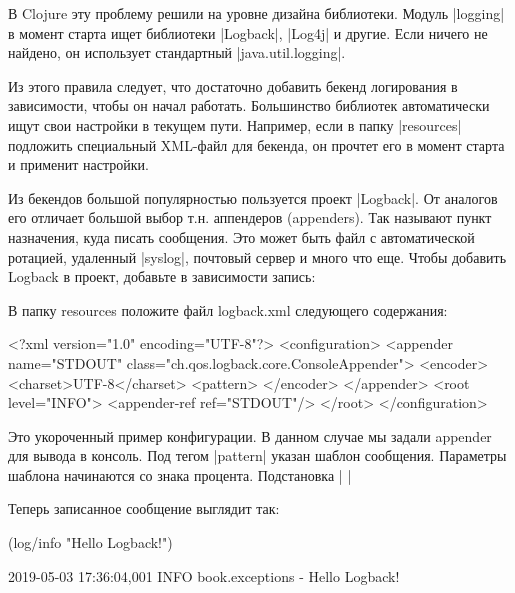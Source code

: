 В Clojure эту проблему решили на уровне дизайна библиотеки. Модуль \spverb|logging| в
момент старта ищет библиотеки \spverb|Logback|, \spverb|Log4j| и другие. Если ничего не
найдено, он использует стандартный \spverb|java.util.logging|.

Из этого правила следует, что достаточно добавить бекенд логирования в
зависимости, чтобы он начал работать. Большинство библиотек автоматически ищут
свои настройки в текущем пути. Например, если в папку \spverb|resources| подложить
специальный XML-файл для бекенда, он прочтет его в момент старта и применит
настройки.

Из бекендов большой популярностью пользуется проект \spverb|Logback|. От аналогов его
отличает большой выбор т.н. аппендеров (appenders). Так называют пункт
назначения, куда писать сообщения. Это может быть файл с автоматической
ротацией, удаленный \spverb|syslog|, почтовый сервер и много что еще. Чтобы добавить
Logback в проект, добавьте в зависимости запись:

\begin{code}
\end{code}

В папку resources положите файл logback.xml следующего содержания:

\begin{code}
<?xml version="1.0" encoding="UTF-8"?>
<configuration>
  <appender name="STDOUT" class="ch.qos.logback.core.ConsoleAppender">
    <encoder>
      <charset>UTF-8</charset>
      <pattern>%
    </encoder>
  </appender>
  <root level="INFO">
    <appender-ref ref="STDOUT"/>
  </root>
</configuration>
\end{code}

Это укороченный пример конфигурации. В данном случае мы задали appender для
вывода в консоль. Под тегом \spverb|pattern| указан шаблон сообщения. Параметры шаблона
начинаются со знака процента. Подстановка \spverb|%
\spverb|%

Теперь записанное сообщение выглядит так:

\begin{code}
(log/info "Hello Logback!")
\end{code}

\begin{code}
2019-05-03 17:36:04,001 INFO  book.exceptions - Hello Logback!
\end{code}

